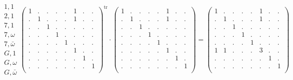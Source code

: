 \documentclass[12pt,a4paper]{amsart}
\begin{document}
\begin{align*}
  \begin{array}{r}
    1,1 \\
    2,1 \\
    7,1 \\
    7,\omega \\
    7,\bar{\omega} \\
    G,1 \\
    G,\omega \\
    G,\bar\omega
  \end{array}
  \left(
  \begin{array}{c|c|ccc|ccc}
    1&.&.&.&.&1&.&.\\\hline
    .&1&.&.&.&1&.&.\\\hline
    .&.&1&.&.&.&.&.\\
    .&.&.&1&.&.&.&.\\
    .&.&.&.&1&.&.&.\\\hline
    .&.&.&.&.&1&.&.\\
    .&.&.&.&.&.&1&.\\
    .&.&.&.&.&.&.&1\\
  \end{array}
\right)^{\mathrm{tr}}
\cdot
  \left(
  \begin{array}{c|c|ccc|ccc}
    1&.&.&.&.&1&.&.\\\hline
    .&1&.&.&.&1&.&.\\\hline
    .&.&1&.&.&.&.&.\\
    .&.&.&1&.&.&.&.\\
    .&.&.&.&1&.&.&.\\\hline
    .&.&.&.&.&1&.&.\\
    .&.&.&.&.&.&1&.\\
    .&.&.&.&.&.&.&1\\
  \end{array}
\right)
=
  \left(
  \begin{array}{c|c|ccc|ccc}
    1&.&.&.&.&1&.&.\\\hline
    .&1&.&.&.&1&.&.\\\hline
    .&.&1&.&.&.&.&.\\
    .&.&.&1&.&.&.&.\\
    .&.&.&.&1&.&.&.\\\hline
    1&1&.&.&.&3&.&.\\
    .&.&.&.&.&.&1&.\\
    .&.&.&.&.&.&.&1\\
  \end{array}
\right)
\end{align*}
\end{document}
